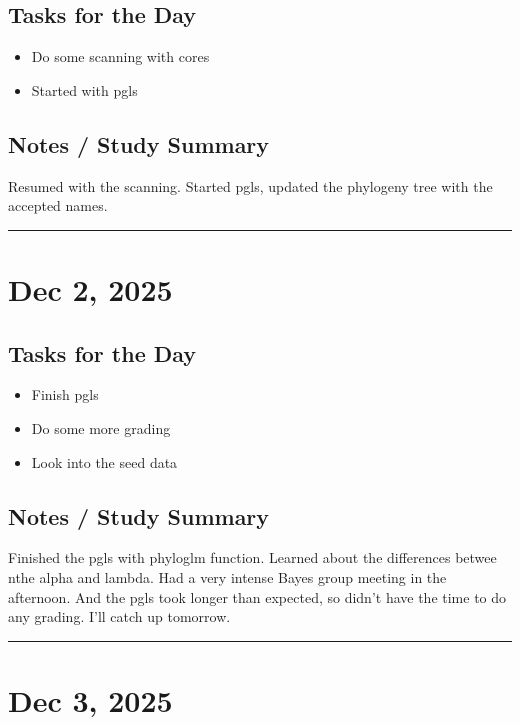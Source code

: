 \documentclass[12pt]{article}
\begin{document}
\subsection*{Tasks for the Day}
\begin{itemize}
    \item Do some scanning with cores
    \item Started with pgls
\end{itemize}
\subsection*{Notes / Study Summary}
Resumed with the scanning. Started pgls, updated the phylogeny tree with the accepted names.

\vspace{1em}
\hrule
\vspace{1em}

\section*{Dec 2, 2025}

\subsection*{Tasks for the Day}
\begin{itemize}
    \item Finish pgls
    \item Do some more grading
    \item Look into the seed data
\end{itemize}
\subsection*{Notes / Study Summary}
Finished the pgls with phyloglm function. Learned about the differences betwee nthe alpha and lambda. Had a very intense Bayes group meeting in the afternoon. And the pgls took longer than expected, so didn't have the time to do any grading. I'll catch up tomorrow.

\vspace{1em}
\hrule
\vspace{1em}

\section*{Dec 3, 2025}
\end{document}
